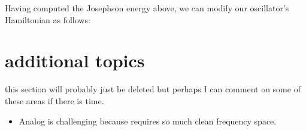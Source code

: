 Having computed the Josephson energy above, we can modify our oscillator's Hamiltonian as follows:











\section{additional topics}
this section will probably just be deleted but perhaps I can comment on some of these areas if there is time.
\begin{itemize}
    \item Analog is challenging because requires so much clean frequency space.
\end{itemize}

